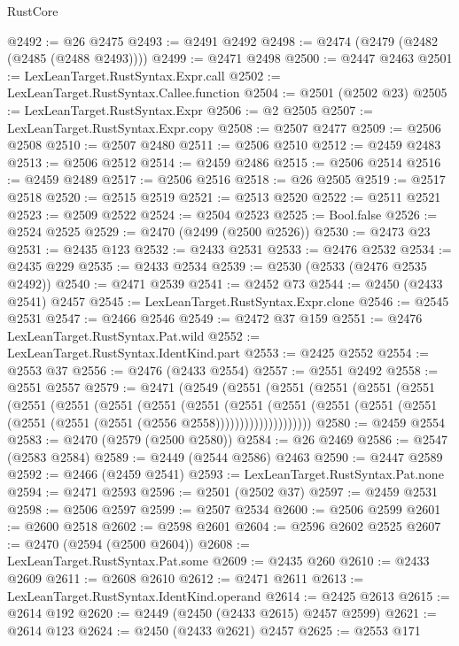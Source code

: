 \begin{lexlean}{RustCore}
\begin{coremodule}
@2492 := @26 @2475
@2493 := @2491 @2492
@2498 := @2474 (@2479 (@2482 (@2485 (@2488 @2493))))
@2499 := @2471 @2498
@2500 := @2447 @2463
@2501 := LexLeanTarget.RustSyntax.Expr.call
@2502 := LexLeanTarget.RustSyntax.Callee.function
@2504 := @2501 (@2502 @23)
@2505 := LexLeanTarget.RustSyntax.Expr
@2506 := @2 @2505
@2507 := LexLeanTarget.RustSyntax.Expr.copy
@2508 := @2507 @2477
@2509 := @2506 @2508
@2510 := @2507 @2480
@2511 := @2506 @2510
@2512 := @2459 @2483
@2513 := @2506 @2512
@2514 := @2459 @2486
@2515 := @2506 @2514
@2516 := @2459 @2489
@2517 := @2506 @2516
@2518 := @26 @2505
@2519 := @2517 @2518
@2520 := @2515 @2519
@2521 := @2513 @2520
@2522 := @2511 @2521
@2523 := @2509 @2522
@2524 := @2504 @2523
@2525 := Bool.false
@2526 := @2524 @2525
@2529 := @2470 (@2499 (@2500 @2526))
@2530 := @2473 @23
@2531 := @2435 @123
@2532 := @2433 @2531
@2533 := @2476 @2532
@2534 := @2435 @229
@2535 := @2433 @2534
@2539 := @2530 (@2533 (@2476 @2535 @2492))
@2540 := @2471 @2539
@2541 := @2452 @73
@2544 := @2450 (@2433 @2541) @2457
@2545 := LexLeanTarget.RustSyntax.Expr.clone
@2546 := @2545 @2531
@2547 := @2466 @2546
@2549 := @2472 @37 @159
@2551 := @2476 LexLeanTarget.RustSyntax.Pat.wild
@2552 := LexLeanTarget.RustSyntax.IdentKind.part
@2553 := @2425 @2552
@2554 := @2553 @37
@2556 := @2476 (@2433 @2554)
@2557 := @2551 @2492
@2558 := @2551 @2557
@2579 := @2471
    (@2549
      (@2551
        (@2551
          (@2551
            (@2551
              (@2551
                (@2551
                  (@2551
                    (@2551
                      (@2551
                        (@2551
                          (@2551
                            (@2551
                              (@2551
                                (@2551 (@2551 (@2551 (@2551 (@2551 (@2556 @2558))))))))))))))))))))
@2580 := @2459 @2554
@2583 := @2470 (@2579 (@2500 @2580))
@2584 := @26 @2469
@2586 := @2547 (@2583 @2584)
@2589 := @2449 (@2544 @2586) @2463
@2590 := @2447 @2589
@2592 := @2466 (@2459 @2541)
@2593 := LexLeanTarget.RustSyntax.Pat.none
@2594 := @2471 @2593
@2596 := @2501 (@2502 @37)
@2597 := @2459 @2531
@2598 := @2506 @2597
@2599 := @2507 @2534
@2600 := @2506 @2599
@2601 := @2600 @2518
@2602 := @2598 @2601
@2604 := @2596 @2602 @2525
@2607 := @2470 (@2594 (@2500 @2604))
@2608 := LexLeanTarget.RustSyntax.Pat.some
@2609 := @2435 @260
@2610 := @2433 @2609
@2611 := @2608 @2610
@2612 := @2471 @2611
@2613 := LexLeanTarget.RustSyntax.IdentKind.operand
@2614 := @2425 @2613
@2615 := @2614 @192
@2620 := @2449 (@2450 (@2433 @2615) @2457 @2599)
@2621 := @2614 @123
@2624 := @2450 (@2433 @2621) @2457
@2625 := @2553 @171

\end{coremodule}
\end{lexlean}
